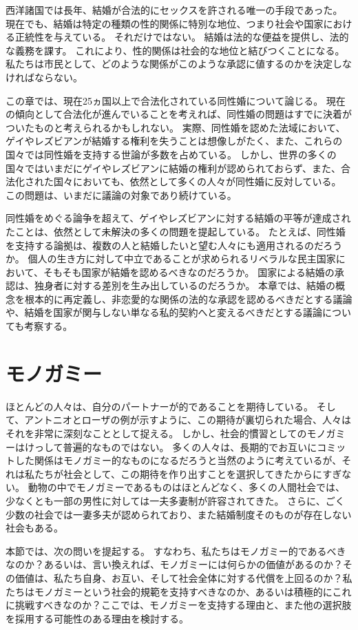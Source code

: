 \documentclass[paper=a4,book,openany]{jlreq}
\begin{document}
西洋諸国では長年、結婚が合法的にセックスを許される唯一の手段であった。
現在でも、結婚は特定の種類の性的関係に特別な地位、つまり社会や国家における正統性を与えている。
それだけではない。
結婚は法的な便益を提供し、法的な義務を課す。
これにより、性的関係は社会的な地位と結びつくことになる。
私たちは市民として、どのような関係がこのような承認に値するのかを決定しなければならない。

この章では、現在25ヵ国以上で合法化されている同性婚について論じる。
現在の傾向として合法化が進んでいることを考えれば、同性婚の問題はすでに決着がついたものと考えられるかもしれない。
実際、同性婚を認めた法域において、ゲイやレズビアンが結婚する権利を失うことは想像しがたく、また、これらの国々では同性婚を支持する世論が多数を占めている。
しかし、世界の多くの国々ではいまだにゲイやレズビアンに結婚の権利が認められておらず、また、合法化された国々においても、依然として多くの人々が同性婚に反対している。
この問題は、いまだに議論の対象であり続けている。

同性婚をめぐる論争を超えて、ゲイやレズビアンに対する結婚の平等が達成されたことは、依然として未解決の多くの問題を提起している。
たとえば、同性婚を支持する論拠は、複数の人と結婚したいと望む人々にも適用されるのだろうか。
個人の生き方に対して中立であることが求められるリベラルな民主国家において、そもそも国家が結婚を認めるべきなのだろうか。
国家による結婚の承認は、独身者に対する差別を生み出しているのだろうか。
本章では、結婚の概念を根本的に再定義し、非恋愛的な関係の法的な承認を認めるべきだとする議論や、結婚を国家が関与しない単なる私的契約へと変えるべきだとする議論についても考察する。

\section{モノガミー}

ほとんどの人々は、自分のパートナーが的であることを期待している。
そして、アントニオとローザの例が示すように、この期待が裏切られた場合、人々はそれを非常に深刻なこととして捉える。
しかし、社会的慣習としてのモノガミーはけっして普遍的なものではない。
多くの人々は、長期的でお互いにコミットした関係はモノガミー的なものになるだろうと当然のように考えているが、それは私たちが社会として、この期待を作り出すことを選択してきたからにすぎない。
動物の中でモノガミーであるものはほとんどなく、多くの人間社会では、少なくとも一部の男性に対しては一夫多妻制が許容されてきた。
さらに、ごく少数の社会では一妻多夫が認められており、また結婚制度そのものが存在しない社会もある。

本節では、次の問いを提起する。
すなわち、私たちはモノガミー的であるべきなのか？あるいは、言い換えれば、モノガミーには何らかの価値があるのか？その価値は、私たち自身、お互い、そして社会全体に対する代償を上回るのか？私たちはモノガミーという社会的規範を支持すべきなのか、あるいは積極的にこれに挑戦すべきなのか？ここでは、モノガミーを支持する理由と、また他の選択肢を採用する可能性のある理由を検討する。
\end{document}

